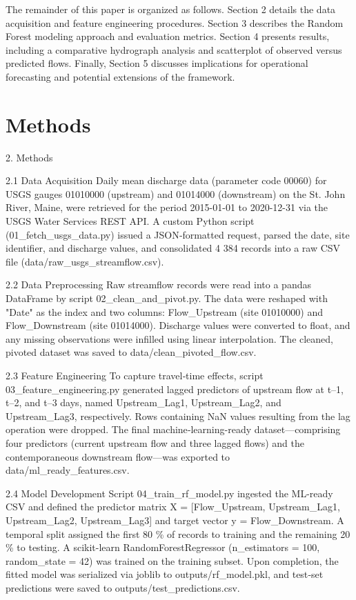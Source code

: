 \documentclass[preprint,12pt]{elsarticle}
\begin{document}
The remainder of this paper is organized as follows. Section 2 details the data acquisition and feature engineering procedures. Section 3 describes the Random Forest modeling approach and evaluation metrics. Section 4 presents results, including a comparative hydrograph analysis and scatterplot of observed versus predicted flows. Finally, Section 5 discusses implications for operational forecasting and potential extensions of the framework.


\section{Methods}

2. Methods

2.1 Data Acquisition  
Daily mean discharge data (parameter code 00060) for USGS gauges 01010000 (upstream) and 01014000 (downstream) on the St. John River, Maine, were retrieved for the period 2015-01-01 to 2020-12-31 via the USGS Water Services REST API. A custom Python script (01\_fetch\_usgs\_data.py) issued a JSON‐formatted request, parsed the date, site identifier, and discharge values, and consolidated 4 384 records into a raw CSV file (data/raw\_usgs\_streamflow.csv).

2.2 Data Preprocessing  
Raw streamflow records were read into a pandas DataFrame by script 02\_clean\_and\_pivot.py. The data were reshaped with "Date" as the index and two columns: Flow\_Upstream (site 01010000) and Flow\_Downstream (site 01014000). Discharge values were converted to float, and any missing observations were infilled using linear interpolation. The cleaned, pivoted dataset was saved to data/clean\_pivoted\_flow.csv.

2.3 Feature Engineering  
To capture travel‐time effects, script 03\_feature\_engineering.py generated lagged predictors of upstream flow at t–1, t–2, and t–3 days, named Upstream\_Lag1, Upstream\_Lag2, and Upstream\_Lag3, respectively. Rows containing NaN values resulting from the lag operation were dropped. The final machine‐learning-ready dataset—comprising four predictors (current upstream flow and three lagged flows) and the contemporaneous downstream flow—was exported to data/ml\_ready\_features.csv.

2.4 Model Development  
Script 04\_train\_rf\_model.py ingested the ML-ready CSV and defined the predictor matrix X = [Flow\_Upstream, Upstream\_Lag1, Upstream\_Lag2, Upstream\_Lag3] and target vector y = Flow\_Downstream. A temporal split assigned the first 80 \% of records to training and the remaining 20 \% to testing. A scikit-learn RandomForestRegressor (n\_estimators = 100, random\_state = 42) was trained on the training subset. Upon completion, the fitted model was serialized via joblib to outputs/rf\_model.pkl, and test‐set predictions were saved to outputs/test\_predictions.csv.
\end{document}
